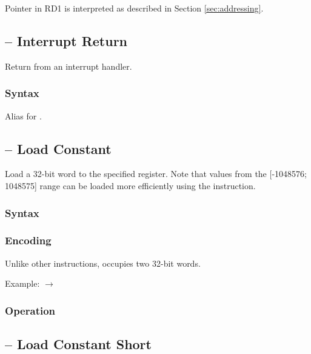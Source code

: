 \documentclass[a4paper,12pt,twoside,extrafontsizes]{memoir}
\begin{document}
{

Pointer in RD1 is interpreted as described in Section \ref{sec:addressing}.

\subsection{ -- Interrupt Return}
\label{subsec:instr:iret}

Return from an interrupt handler.

\subsubsection{Syntax}


Alias for .

\subsection{ -- Load Constant}
\label{subsec:instr:lc}

Load a 32-bit word to the specified register. Note that values from the [-1048576; 1048575] range can be loaded more efficiently using the  instruction.

\subsubsection{Syntax}


\subsubsection{Encoding}


Unlike other instructions,  occupies two 32-bit words.

Example:  $\rightarrow$ 

\subsubsection{Operation}


\subsection{ -- Load Constant Short}
\label{subsec:instr:lcs}

}
\end{document}

